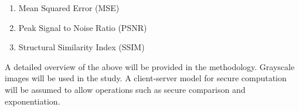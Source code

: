 \begin{enumerate}
		\item Mean Squared Error (MSE)
		\item Peak Signal to Noise Ratio (PSNR)
		\item Structural Similarity Index (SSIM)
\end{enumerate}
A detailed overview of the above will be provided in the methodology. Grayscale images will be used in the study.
A client-server model for secure computation will be assumed to allow operations such as secure comparison and exponentiation.
